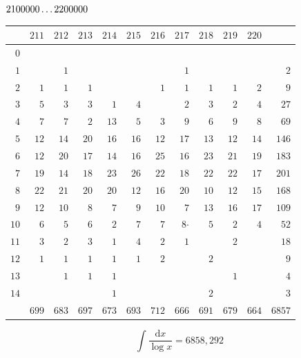 \par\medskip
\noindent\begin{minipage}{\linewidth}\centering
{}
\(2100000\mathinner{.\,.\,.}2200000\)\par\smallskip
\begingroup\fontsize{10.5}{11.5}\selectfont\setlength{\tabcolsep}{3.5pt}\renewcommand{\arraystretch}{1}
\begin{tabular}{r|rrrrrrrrrr|r}\hline
 & $211$ & $212$ & $213$ & $214$ & $215$ & $216$ & $217$ & $218$ & $219$ & $220$ &  \\ \hline
$0$ &  &  &  &  &  &  &  &  &  &  &  \\
$1$ &  & $1$ &  &  &  &  & $1$ &  &  &  & $2$ \\
$2$ & $1$ & $1$ & $1$ &  &  & $1$ & $1$ & $1$ & $1$ & $2$ & $9$ \\
$3$ & $5$ & $3$ & $3$ & $1$ & $4$ &  & $2$ & $3$ & $2$ & $4$ & $27$ \\
$4$ & $7$ & $7$ & $2$ & $13$ & $5$ & $3$ & $9$ & $6$ & $9$ & $8$ & $69$ \\
$5$ & $12$ & $14$ & $20$ & $16$ & $16$ & $12$ & $17$ & $13$ & $12$ & $14$ & $146$ \\
$6$ & $12$ & $20$ & $17$ & $14$ & $16$ & $25$ & $16$ & $23$ & $21$ & $19$ & $183$ \\
$7$ & $19$ & $14$ & $18$ & $23$ & $26$ & $22$ & $18$ & $22$ & $22$ & $17$ & $201$ \\
$8$ & $22$ & $21$ & $20$ & $20$ & $12$ & $16$ & $20$ & $10$ & $12$ & $15$ & $168$ \\
$9$ & $12$ & $10$ & $8$ & $7$ & $9$ & $10$ & $7$ & $13$ & $16$ & $17$ & $109$ \\
$10$ & $6$ & $5$ & $6$ & $2$ & $7$ & $7$ & $8\mathord{\cdot}$ & $5$ & $2$ & $4$ & $52$ \\
$11$ & $3$ & $2$ & $3$ & $1$ & $4$ & $2$ & $1$ &  & $2$ &  & $18$ \\
$12$ & $1$ & $1$ & $1$ & $1$ & $1$ & $2$ &  & $2$ &  &  & $9$ \\
$13$ &  & $1$ & $1$ & $1$ &  &  &  &  & $1$ &  & $4$ \\
$14$ &  &  &  & $1$ &  &  &  & $2$ &  &  & $3$ \\
\hline
 & $699$ & $683$ & $697$ & $673$ & $693$ & $712$ & $666$ & $691$ & $679$ & $664$ & $6857$ \\ \hline
\end{tabular}\par\endgroup
\setlength{\abovedisplayskip}{6pt}\setlength{\belowdisplayskip}{4pt}
\[\int\frac{\mathrm{d}x}{\log x}=6858{,}292\]
\end{minipage}\par
